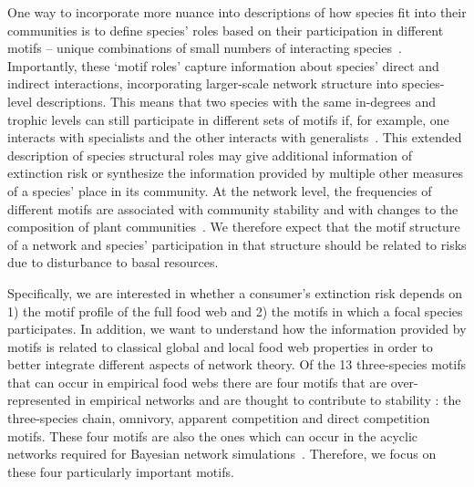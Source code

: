 \documentclass[12pt]{article}
\begin{document}
\begin{spacing}{2.0}
    
    One way to incorporate more nuance into descriptions of how species fit into their communities is to define species' roles based on their participation in different motifs -- unique combinations of small numbers of interacting species~\citep{Stouffer2007,Stouffer2012}. Importantly, these `motif roles' capture information about species' direct and indirect interactions, incorporating larger-scale network structure into species-level descriptions. 
    This means that two species with the same in-degrees and trophic levels can still participate in different sets of motifs if, for example, one interacts with specialists and the other interacts with generalists~\citep{Cirtwill2018FoodWebs}. 
    This extended description of species structural roles may give additional information of extinction risk or synthesize the information provided by multiple other measures of a species' place in its community.
    At the network level, the frequencies of different motifs are associated with community stability \citep{prill2005dynamic, bascompte2005simple} and with changes to the composition of plant communities~\cite{giling2019plant}. 
    We therefore expect that the motif structure of a network and species' participation in that structure should be related to risks due to disturbance to basal resources. 
    
    Specifically, we are interested in whether a consumer's extinction risk depends on 1) the motif profile of the full food web and 2) the motifs in which a focal species participates. 
    In addition, we want to understand how the information provided by motifs is related to classical global and local food web properties in order to better integrate different aspects of network theory.
    Of the 13 three-species motifs that can occur in empirical food webs there are four motifs that are over-represented in empirical networks and are thought to contribute to stability \citep{Stouffer2007, Borrelli2015a, giling2019plant}: the three-species chain, omnivory, apparent competition and direct competition motifs.
    These four motifs are also the ones which can occur in the acyclic networks required for Bayesian network simulations~\citep{Eklof2013}. 
    Therefore, we focus on these four particularly important motifs.  
    


\end{spacing}
\end{document}
